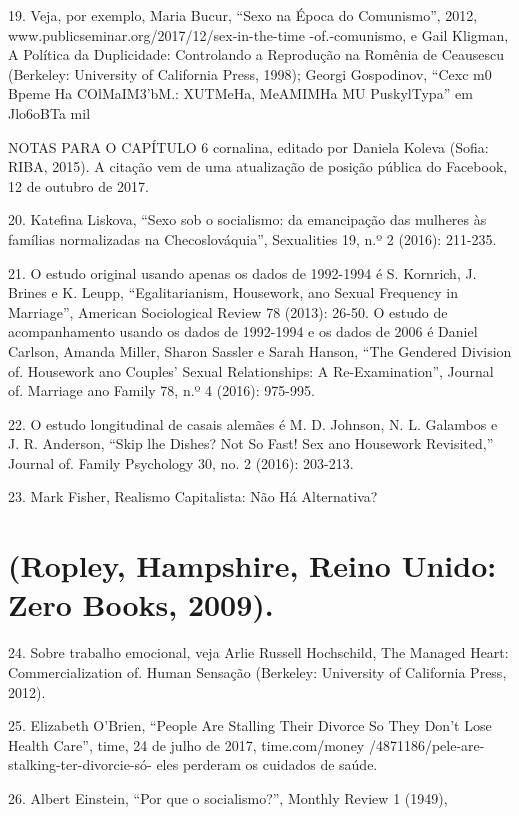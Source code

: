  \par 
19. Veja, por exemplo, Maria Bucur, “Sexo na Época do Comunismo”, 2012, www.publicseminar.org/2017/12/sex-in-the-time -of.-comunismo, e Gail Kligman, A Política da Duplicidade: Controlando a Reprodução na Romênia de Ceausescu (Berkeley: University of California Press, 1998); Georgi Gospodinov, “Cexc m0 Bpeme Ha COlMaIM3'bM.: XUTMeHa, MeAMIMHa MU PuskylTypa” em Jlo6oBTa mil
 \par 
NOTAS PARA O CAPÍTULO {\color{blue}6} cornalina, editado por Daniela Koleva (Sofia: RIBA, 2015). A citação vem de uma atualização de posição pública do Facebook, {\color{blue}12} de outubro de 2017.
 \par 
20. Katefina Liskova, “Sexo sob o socialismo: da emancipação das mulheres às famílias normalizadas na Checoslováquia”, Sexualities 19, n.º {\color{blue}2} (2016): 211-235.
 \par 
21. O estudo original usando apenas os dados de 1992-1994 é S. Kornrich, J. Brines e K. Leupp, “Egalitarianism, Housework, ano Sexual Frequency in Marriage”, American Sociological Review {\color{blue}78} (2013): 26-50. O estudo de acompanhamento usando os dados de 1992-1994 e os dados de 2006 é Daniel Carlson, Amanda Miller, Sharon Sassler e Sarah Hanson, “The Gendered Division of. Housework ano Couples’ Sexual Relationships: A Re-Examination”, Journal of. Marriage ano Family 78, n.º {\color{blue}4} (2016): 975-995.
 \par 
22. O estudo longitudinal de casais alemães é M. D. Johnson, N. L. Galambos e J. R. Anderson, “Skip lhe Dishes? Not So Fast! Sex ano Housework Revisited,” Journal of. Family Psychology 30, no. {\color{blue}2} (2016): 203-213.
 \par 
23. Mark Fisher, Realismo Capitalista: Não Há Alternativa?
 \par 
\section{(Ropley, Hampshire, Reino Unido: Zero Books, 2009).}
 \par 
24. Sobre trabalho emocional, veja Arlie Russell Hochschild, The Managed Heart: Commercialization of. Human Sensação (Berkeley: University of California Press, 2012).
 \par 
25. Elizabeth O'Brien, “People Are Stalling Their Divorce So They Don't Lose Health Care”, time, {\color{blue}24} de julho de 2017, time.com/money /4871186/pele-are-stalking-ter-divorcie-só- eles perderam os cuidados de saúde.
 \par 
26. Albert Einstein, “Por que o socialismo?”, Monthly Review {\color{blue}1} (1949),
 \par 
